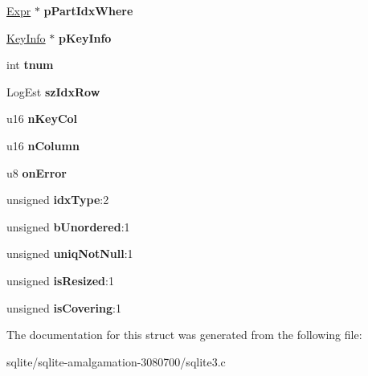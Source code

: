 \begin{DoxyCompactItemize}
\item 
\hypertarget{struct_index_a92dd15cc702e261dc2face5a27820e07}{\hyperlink{struct_expr}{Expr} $\ast$ {\bfseries p\+Part\+Idx\+Where}}\label{struct_index_a92dd15cc702e261dc2face5a27820e07}

\item 
\hypertarget{struct_index_aa30f2419c99da3f4288ec7d1dd352f21}{\hyperlink{struct_key_info}{Key\+Info} $\ast$ {\bfseries p\+Key\+Info}}\label{struct_index_aa30f2419c99da3f4288ec7d1dd352f21}

\item 
\hypertarget{struct_index_af895a09c01701021c3e36362c04a1ae6}{int {\bfseries tnum}}\label{struct_index_af895a09c01701021c3e36362c04a1ae6}

\item 
\hypertarget{struct_index_a9048746be17e02ffb3ac6d6a228e4a62}{Log\+Est {\bfseries sz\+Idx\+Row}}\label{struct_index_a9048746be17e02ffb3ac6d6a228e4a62}

\item 
\hypertarget{struct_index_acfd52a6b0c7be163dcaf524574f69331}{u16 {\bfseries n\+Key\+Col}}\label{struct_index_acfd52a6b0c7be163dcaf524574f69331}

\item 
\hypertarget{struct_index_ab0e748636131297b5243e61ee9a8042c}{u16 {\bfseries n\+Column}}\label{struct_index_ab0e748636131297b5243e61ee9a8042c}

\item 
\hypertarget{struct_index_ae8bf87d0414e5c46b86192cfbdd271a7}{u8 {\bfseries on\+Error}}\label{struct_index_ae8bf87d0414e5c46b86192cfbdd271a7}

\item 
\hypertarget{struct_index_aebd62422c514bd90aab41606bec71032}{unsigned {\bfseries idx\+Type}\+:2}\label{struct_index_aebd62422c514bd90aab41606bec71032}

\item 
\hypertarget{struct_index_ae96b00c29b348bce9d58a5073fdb6d3e}{unsigned {\bfseries b\+Unordered}\+:1}\label{struct_index_ae96b00c29b348bce9d58a5073fdb6d3e}

\item 
\hypertarget{struct_index_a541590f6cf6c45705b3ef19fdce091ca}{unsigned {\bfseries uniq\+Not\+Null}\+:1}\label{struct_index_a541590f6cf6c45705b3ef19fdce091ca}

\item 
\hypertarget{struct_index_ad9c4a83513b3cf885782dcd459ed061f}{unsigned {\bfseries is\+Resized}\+:1}\label{struct_index_ad9c4a83513b3cf885782dcd459ed061f}

\item 
\hypertarget{struct_index_ac4151fa2557d26d7c538f25a03d0b44e}{unsigned {\bfseries is\+Covering}\+:1}\label{struct_index_ac4151fa2557d26d7c538f25a03d0b44e}

\end{DoxyCompactItemize}


The documentation for this struct was generated from the following file\+:\begin{DoxyCompactItemize}
\item 
sqlite/sqlite-\/amalgamation-\/3080700/sqlite3.\+c\end{DoxyCompactItemize}
